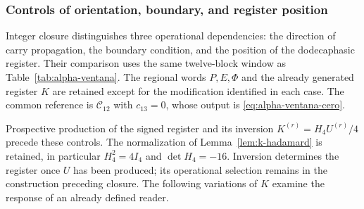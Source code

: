 \subsubsection{Controls of orientation, boundary, and register position}
\label{mg05:controles}

Integer closure distinguishes three operational dependencies:
the direction of carry propagation, the boundary condition, and the
position of the dodecaphasic register. Their comparison uses the same
twelve-block window as Table~\ref{tab:alpha-ventana}. The regional
words \(P,E,\Phi\) and the already generated register \(K\) are
retained except for the modification identified in each case. The
common reference is \(\mathcal C_{12}\) with \(c_{13}=0\), whose
output is \eqref{eq:alpha-ventana-cero}.

Prospective production of the signed register and its inversion
\(K^{(r)}=H_4U^{(r)}/4\) precede these controls. The normalization
of Lemma~\ref{lem:k-hadamard} is retained, in particular
\(H_4^2=4I_4\) and \(\det H_4=-16\). Inversion determines the
register once \(U\) has been produced; its operational selection
remains in the construction preceding closure. The following
variations of \(K\) examine the response of an already defined
reader.

